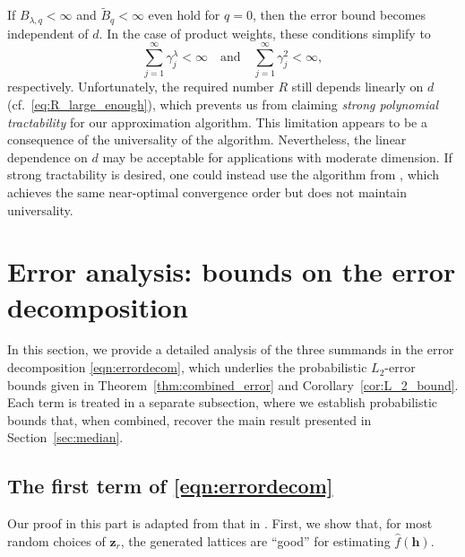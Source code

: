 \documentclass[a4paper,11pt]{article}
\newcommand{\bsh}{\boldsymbol{h}}
\newcommand{\bsz}{\boldsymbol{z}}
\begin{document}
If $B_{\lambda,q}<\infty$ and $\widetilde{B}_q<\infty$ even hold for $q=0$, then the error bound becomes independent of $d$. In the case of product weights, these conditions simplify to
\[ \sum_{j=1}^{\infty}\gamma_j^{\lambda}<\infty\quad \text{and}\quad \sum_{j=1}^{\infty}\gamma_j^2<\infty, \]
respectively.
Unfortunately, the required number $R$ still depends linearly on $d$ (cf.\ \eqref{eq:R_large_enough}), which prevents us from claiming \textit{strong polynomial tractability} for our approximation algorithm. This limitation appears to be a consequence of the universality of the algorithm. Nevertheless, the linear dependence on $d$ may be acceptable for applications with moderate dimension. If strong tractability is desired, one could instead use the algorithm from \cite{PKG24}, which achieves the same near-optimal convergence order but does not maintain universality.


\section{Error analysis: bounds on the error decomposition}\label{sec:error}

In this section, we provide a detailed analysis of the three summands in the error decomposition \eqref{eqn:errordecom}, which underlies the probabilistic $L_2$-error bounds given in Theorem~\ref{thm:combined_error} and Corollary~\ref{cor:L_2_bound}. Each term is treated in a separate subsection, where we establish probabilistic bounds that, when combined, recover the main result presented in Section~\ref{sec:median}.

\subsection{The first term of \eqref{eqn:errordecom}}

Our proof in this part is adapted from that in \cite{PKG24}. 
First, we show that, for most random choices of $\bsz_r$, the generated lattices are ``good'' for estimating $\widehat{f}(\bsh)$.
\end{document}
